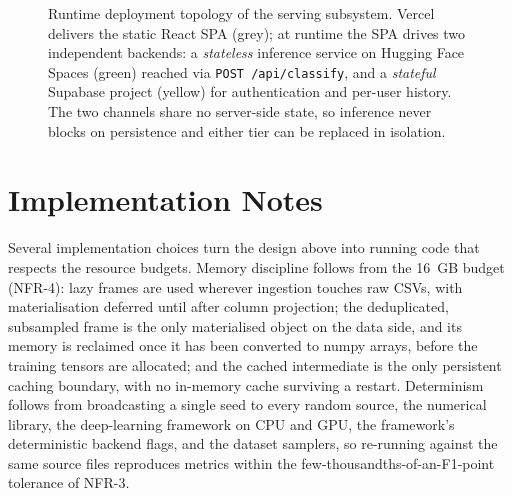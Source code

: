 \begin{figure}[htbp]
{%
    }
    \caption{Runtime deployment topology of the serving subsystem. Vercel delivers the static React SPA (grey); at runtime the SPA drives two independent backends: a \emph{stateless} inference service on Hugging Face Spaces (green) reached via \texttt{POST /api/classify}, and a \emph{stateful} Supabase project (yellow) for authentication and per-user history. The two channels share no server-side state, so inference never blocks on persistence and either tier can be replaced in isolation.}
    \label{fig:deployment_topology}
\end{figure}

\section{Implementation Notes}
\label{sec:implementation_details}

\par Several implementation choices turn the design above into running code that respects the resource budgets. Memory discipline follows from the 16~GB budget (NFR-4): lazy frames are used wherever ingestion touches raw CSVs, with materialisation deferred until after column projection; the deduplicated, subsampled frame is the only materialised object on the data side, and its memory is reclaimed once it has been converted to numpy arrays, before the training tensors are allocated; and the cached intermediate is the only persistent caching boundary, with no in-memory cache surviving a restart. Determinism follows from broadcasting a single seed to every random source, the numerical library, the deep-learning framework on CPU and GPU, the framework's deterministic backend flags, and the dataset samplers, so re-running against the same source files reproduces metrics within the few-thousandths-of-an-F1-point tolerance of NFR-3.

